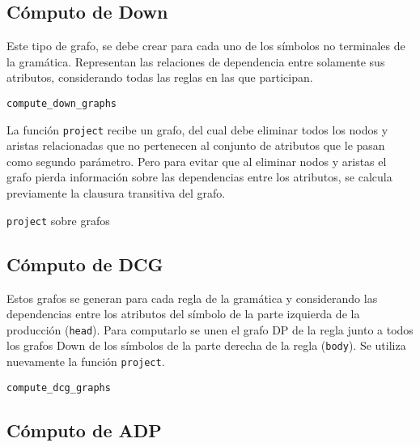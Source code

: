 \subsection{Cómputo de Down}

Este tipo de grafo, se debe crear para cada uno de los símbolos no terminales de la gramática. Representan las relaciones de dependencia entre solamente sus atributos, considerando todas las reglas en las que participan.

\begin{algorithm}[H]

\caption{\texttt{compute\_down\_graphs}}
\end{algorithm}

La función \texttt{project} recibe un grafo, del cual debe eliminar todos los nodos y aristas relacionadas que no pertenecen al conjunto de atributos que le pasan como segundo parámetro. Pero para evitar que al eliminar nodos y aristas el grafo pierda información sobre las dependencias entre los atributos, se calcula previamente la clausura transitiva del grafo.

\begin{algorithm}[H]

\caption{\texttt{project} sobre grafos}
\end{algorithm}

\subsection{Cómputo de DCG}
\label{subsec:alg-DCG}
Estos grafos se generan para cada regla de la gramática y considerando las dependencias entre los atributos del símbolo de la parte izquierda de la producción (\texttt{head}). Para computarlo se unen el grafo DP de la regla junto a todos los grafos Down de los símbolos de la parte derecha de la regla (\texttt{body}). Se utiliza nuevamente la función \texttt{project}.

\begin{algorithm}[H]

\caption{\texttt{compute\_dcg\_graphs}}
\end{algorithm}

\subsection{Cómputo de ADP}

